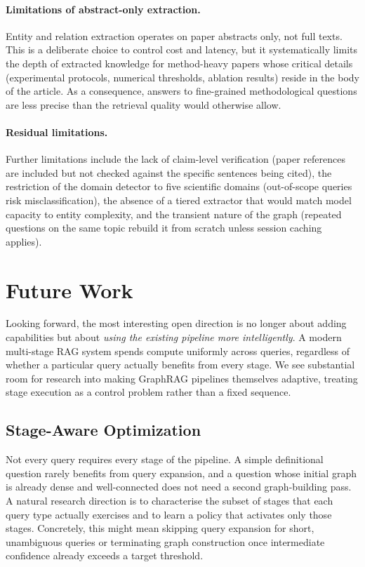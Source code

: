 \documentclass[11pt,a4paper]{article}
\begin{document}
\paragraph{Limitations of abstract-only extraction.}
Entity and relation extraction operates on paper abstracts only, not full
texts. This is a deliberate choice to control cost and latency, but it
systematically limits the depth of extracted knowledge for method-heavy
papers whose critical details (experimental protocols, numerical thresholds,
ablation results) reside in the body of the article. As a consequence,
answers to fine-grained methodological questions are less precise than the
retrieval quality would otherwise allow.

\paragraph{Residual limitations.}
Further limitations include the lack of claim-level verification (paper
references are included but not checked against the specific sentences being
cited), the restriction of the domain detector to five scientific domains
(out-of-scope queries risk misclassification), the absence of a tiered
extractor that would match model capacity to entity complexity, and the
transient nature of the graph (repeated questions on the same topic rebuild
it from scratch unless session caching applies).

\section{Future Work}

Looking forward, the most interesting open direction is no longer about
adding capabilities but about \emph{using the existing pipeline more
intelligently}. A modern multi-stage RAG system spends compute uniformly
across queries, regardless of whether a particular query actually benefits
from every stage. We see substantial room for research into making
GraphRAG pipelines themselves adaptive, treating stage execution as a
control problem rather than a fixed sequence.

\subsection{Stage-Aware Optimization}

Not every query requires every stage of the pipeline. A simple definitional
question rarely benefits from query expansion, and a question whose initial
graph is already dense and well-connected does not need a second
graph-building pass. A natural research direction is to characterise the
subset of stages that each query type actually exercises and to learn a
policy that activates only those stages. Concretely, this might mean
skipping query expansion for short, unambiguous queries or terminating
graph construction once intermediate confidence already exceeds a target
threshold.
\end{document}
